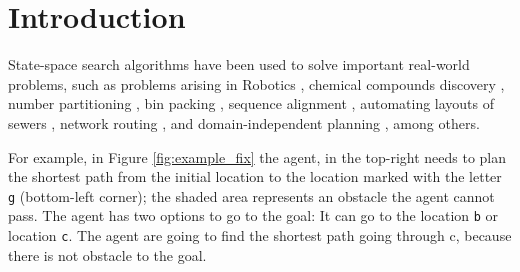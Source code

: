 

\chapter{Introduction}\label{aboutTheProblem}
\noindent
State-space search algorithms have been used to solve important real-world problems, such as problems arising in Robotics \cite{DBLP:journals/corr/BadruddinA15}, chemical compounds discovery \cite{Heifets:2012:CNM:2900929.2900950}, number partitioning \cite{Korf:1998:CAA:297463.297468}, bin packing \cite{Korf:2002:NAO:777092.777205}, sequence alignment \cite{Korf:2000:DFS:647288.721444}, automating layouts of sewers \cite{Burch:2010:ALS:1860967.1861096}, network routing \cite{DBLP:conf/icc/LiHH05}, and domain-independent planning \cite{Bonet:2001:PHS:380331.380332}, among others.

\iffalse
For example, in Figure \ref{fig:example_fix} the agent, in the top-right needs to plan the shortest path from the initial location to the location marked with the letter \texttt{g} (bottom-left corner); the shaded area represents an obstacle the agent cannot pass. The agent has two options to go to the goal: It can go to the location \texttt{b} or location \texttt{c}. The agent are going to find the shortest path going through c, because there is not obstacle to the goal. 

